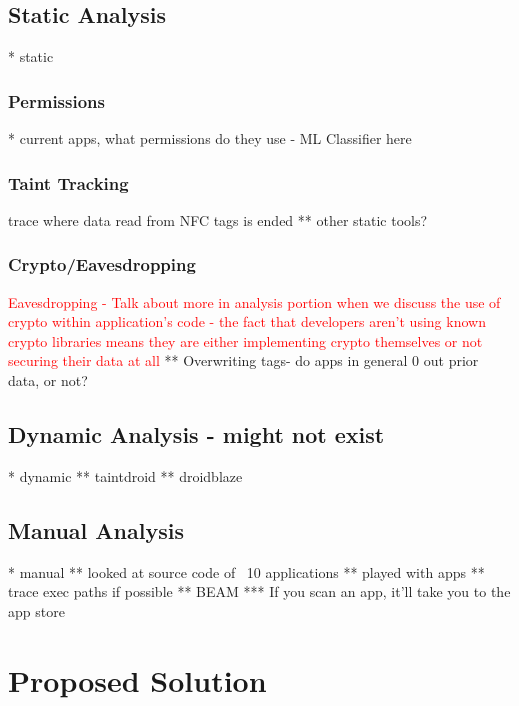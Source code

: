 \documentclass[12pt]{article}
\newcommand\TODO[1]{\textcolor{red}{#1}}
\begin{document}
\subsection{Static Analysis}
* static
\subsubsection{Permissions}
* current apps, what permissions do they use - ML Classifier here
\subsubsection{Taint Tracking}
trace where data read from NFC tags is ended
** other static tools? 
\subsubsection{Crypto/Eavesdropping}
\TODO{Eavesdropping - Talk about more in analysis portion when we discuss the use of crypto within application's code - the fact that developers aren't using known crypto libraries means they are either implementing crypto themselves or not securing their data at all} 
** Overwriting tags- do apps in general 0 out prior data, or not?

\subsection{Dynamic Analysis - might not exist}
* dynamic
** taintdroid
** droidblaze

\subsection{Manual Analysis}
* manual
** looked at source code of ~10 applications
** played with apps
** trace exec paths if possible
** BEAM
*** If you scan an app, it'll take you to the app store

\section{Proposed Solution}
% 
% 
% 
% 
% 
% 
% 
% 
% 
% 
\end{document}
